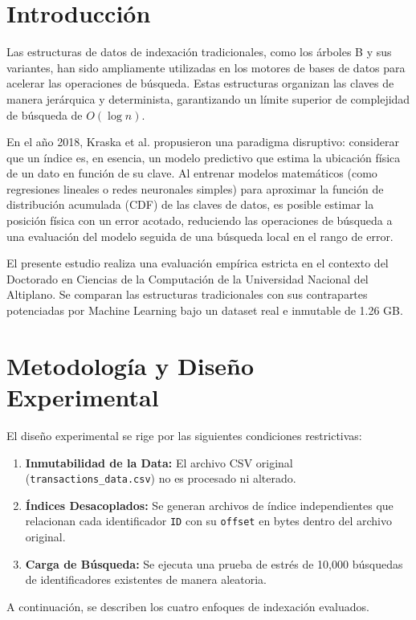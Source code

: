 \documentclass[twocolumn,10pt,journal]{IEEEtran}
\begin{document}
\section{Introducci\'on}
Las estructuras de datos de indexación tradicionales, como los árboles B y sus variantes, han sido ampliamente utilizadas en los motores de bases de datos para acelerar las operaciones de búsqueda. Estas estructuras organizan las claves de manera jerárquica y determinista, garantizando un límite superior de complejidad de búsqueda de $O(\log n)$.

En el año 2018, Kraska et al. \cite{kraska2018case} propusieron una paradigma disruptivo: considerar que un índice es, en esencia, un modelo predictivo que estima la ubicación física de un dato en función de su clave. Al entrenar modelos matemáticos (como regresiones lineales o redes neuronales simples) para aproximar la función de distribución acumulada (CDF) de las claves de datos, es posible estimar la posición física con un error acotado, reduciendo las operaciones de búsqueda a una evaluación del modelo seguida de una búsqueda local en el rango de error.

El presente estudio realiza una evaluación empírica estricta en el contexto del Doctorado en Ciencias de la Computación de la Universidad Nacional del Altiplano. Se comparan las estructuras tradicionales con sus contrapartes potenciadas por Machine Learning bajo un dataset real e inmutable de 1.26 GB.

\section{Metodolog\'ia y Dise\~no Experimental}
El diseño experimental se rige por las siguientes condiciones restrictivas:
\begin{enumerate}
    \item \textbf{Inmutabilidad de la Data:} El archivo CSV original (\texttt{transactions\_data.csv}) no es procesado ni alterado.
    \item \textbf{Índices Desacoplados:} Se generan archivos de índice independientes que relacionan cada identificador \texttt{ID} con su \texttt{offset} en bytes dentro del archivo original.
    \item \textbf{Carga de Búsqueda:} Se ejecuta una prueba de estrés de 10,000 búsquedas de identificadores existentes de manera aleatoria.
\end{enumerate}

A continuación, se describen los cuatro enfoques de indexación evaluados.
\end{document}
